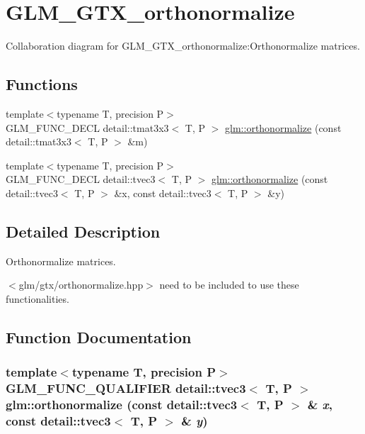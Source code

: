 \hypertarget{group__gtx__orthonormalize}{
\section{GLM\_\-GTX\_\-orthonormalize}
\label{group__gtx__orthonormalize}
}


Collaboration diagram for GLM\_\-GTX\_\-orthonormalize:Orthonormalize matrices.  
\subsection*{Functions}
\begin{CompactItemize}
\item 
{\footnotesize template$<$typename T, precision P$>$ }\\GLM\_\-FUNC\_\-DECL detail::tmat3x3$<$ T, P $>$ \hyperlink{group__gtx__orthonormalize_ge0c06d8312a13b38747271ea68f00121}{glm::orthonormalize} (const detail::tmat3x3$<$ T, P $>$ \&m)
\item 
{\footnotesize template$<$typename T, precision P$>$ }\\GLM\_\-FUNC\_\-DECL detail::tvec3$<$ T, P $>$ \hyperlink{group__gtx__orthonormalize_g6e5ecb7642087e4ff470c8f068c903be}{glm::orthonormalize} (const detail::tvec3$<$ T, P $>$ \&x, const detail::tvec3$<$ T, P $>$ \&y)
\end{CompactItemize}


\subsection{Detailed Description}
Orthonormalize matrices. 

$<$glm/gtx/orthonormalize.hpp$>$ need to be included to use these functionalities. 

\subsection{Function Documentation}
\hypertarget{group__gtx__orthonormalize_g6e5ecb7642087e4ff470c8f068c903be}{
\subsubsection[orthonormalize]{\setlength{\rightskip}{0pt plus 5cm}template$<$typename T, precision P$>$ GLM\_\-FUNC\_\-QUALIFIER detail::tvec3$<$ T, P $>$ glm::orthonormalize (const detail::tvec3$<$ T, P $>$ \& {\em x}, \/  const detail::tvec3$<$ T, P $>$ \& {\em y})}}
\label{group__gtx__orthonormalize_g6e5ecb7642087e4ff470c8f068c903be}


